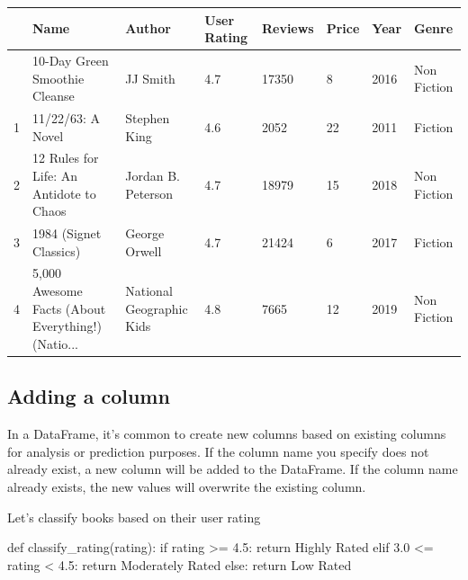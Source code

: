 \documentclass[
  letterpaper,
  DIV=11,
  numbers=noendperiod]{scrreprt}
\newenvironment{Shaded}{\begin{snugshade}}{\end{snugshade}}
\newcommand{\ControlFlowTok}[1]{\textcolor[rgb]{0.00,0.23,0.31}{#1}}
\newcommand{\FloatTok}[1]{\textcolor[rgb]{0.68,0.00,0.00}{#1}}
\newcommand{\KeywordTok}[1]{\textcolor[rgb]{0.00,0.23,0.31}{#1}}
\newcommand{\NormalTok}[1]{\textcolor[rgb]{0.00,0.23,0.31}{#1}}
\newcommand{\OperatorTok}[1]{\textcolor[rgb]{0.37,0.37,0.37}{#1}}
\newcommand{\StringTok}[1]{\textcolor[rgb]{0.13,0.47,0.30}{#1}}
\begin{document}
\begin{longtable}[]{@{}llllllll@{}}
\toprule\noalign{}
& Name & Author & User Rating & Reviews & Price & Year & Genre \\
\midrule\noalign{}
\endhead
\bottomrule\noalign{}
\endlastfoot
0 & 10-Day Green Smoothie Cleanse & JJ Smith & 4.7 & 17350 & 8 & 2016 &
Non Fiction \\
1 & 11/22/63: A Novel & Stephen King & 4.6 & 2052 & 22 & 2011 &
Fiction \\
2 & 12 Rules for Life: An Antidote to Chaos & Jordan B. Peterson & 4.7 &
18979 & 15 & 2018 & Non Fiction \\
3 & 1984 (Signet Classics) & George Orwell & 4.7 & 21424 & 6 & 2017 &
Fiction \\
4 & 5,000 Awesome Facts (About Everything!) (Natio... & National
Geographic Kids & 4.8 & 7665 & 12 & 2019 & Non Fiction \\
\end{longtable}

\hypertarget{adding-a-column}{%
\subsection{Adding a column}\label{adding-a-column}}

In a DataFrame, it's common to create new columns based on existing
columns for analysis or prediction purposes. If the column name you
specify does not already exist, a new column will be added to the
DataFrame. If the column name already exists, the new values will
overwrite the existing column.

Let's classify books based on their user rating

\begin{Shaded}
\begin{Highlighting}[]
\KeywordTok{def}\NormalTok{ classify\_rating(rating):}
    \ControlFlowTok{if}\NormalTok{ rating }\OperatorTok{\textgreater{}=} \FloatTok{4.5}\NormalTok{:}
        \ControlFlowTok{return} \StringTok{\textquotesingle{}Highly Rated\textquotesingle{}}
    \ControlFlowTok{elif} \FloatTok{3.0} \OperatorTok{\textless{}=}\NormalTok{ rating }\OperatorTok{\textless{}} \FloatTok{4.5}\NormalTok{:}
        \ControlFlowTok{return} \StringTok{\textquotesingle{}Moderately Rated\textquotesingle{}}
    \ControlFlowTok{else}\NormalTok{:}
        \ControlFlowTok{return} \StringTok{\textquotesingle{}Low Rated\textquotesingle{}}
\end{Highlighting}
\end{Shaded}
\end{document}
